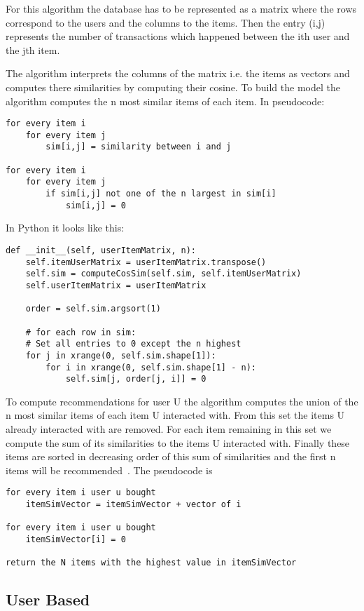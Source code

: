 For this algorithm the database has to be represented as a matrix
where the rows correspond to the users and the columns to the items.
Then the entry (i,j) represents the number of transactions which happened
between the ith user and the jth item. 

The algorithm interprets the columns of the matrix i.e. the items
as vectors and computes there similarities by computing their cosine.
To build the model the algorithm computes the n most similar items
of each item. In pseudocode:
\begin{lstlisting}
for every item i
    for every item j
        sim[i,j] = similarity between i and j

for every item i
    for every item j
        if sim[i,j] not one of the n largest in sim[i]
            sim[i,j] = 0
\end{lstlisting}
In Python it looks like this:
\begin{lstlisting}
def __init__(self, userItemMatrix, n):
    self.itemUserMatrix = userItemMatrix.transpose()
    self.sim = computeCosSim(self.sim, self.itemUserMatrix)
    self.userItemMatrix = userItemMatrix

    order = self.sim.argsort(1)

    # for each row in sim:
    # Set all entries to 0 except the n highest
    for j in xrange(0, self.sim.shape[1]):
        for i in xrange(0, self.sim.shape[1] - n):
            self.sim[j, order[j, i]] = 0
\end{lstlisting}

To compute recommendations for user U the algorithm computes
the union of the n most similar items of each item U interacted with.
From this set the items U already interacted with are removed. For
each item remaining in this set we compute the sum of its similarities
to the items U interacted with. Finally these items are sorted in
decreasing order of this sum of similarities and the first n items
will be recommended~\cite{Karypis:2001:EIT:502585.502627}.
The pseudocode is
\begin{lstlisting}
for every item i user u bought
    itemSimVector = itemSimVector + vector of i

for every item i user u bought
    itemSimVector[i] = 0

return the N items with the highest value in itemSimVector
\end{lstlisting}



\subsection{User Based}

